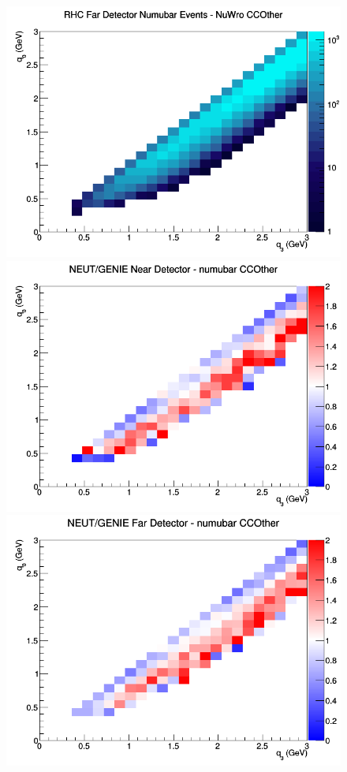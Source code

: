 \begin{figure}[h]
\endminipage
{}
\includegraphics[width=\linewidth]{q0_q3/nominal/CCOther_RHC_FD_numubar_q3_q0_NuWro.png}
\endminipage
\newline
{}
\includegraphics[width=\linewidth]{q0_q3/nominal/ratios/CCOther_NEUT_GENIE_numubar_near_q3_q0.png}
\endminipage
{}
\includegraphics[width=\linewidth]{q0_q3/nominal/ratios/CCOther_NEUT_GENIE_numubar_far_q3_q0.png}

\end{figure}
